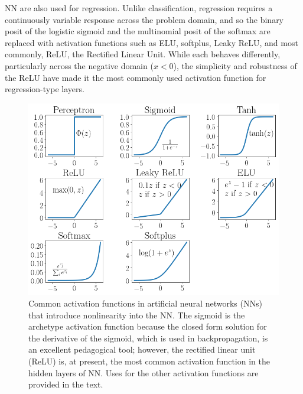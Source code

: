 NN are also used for regression. Unlike classification, regression requires a continuously variable response across the problem domain, and so the binary posit of the logistic sigmoid and the multinomial posit of the softmax are replaced with activation functions such as ELU, softplus, Leaky ReLU, and most commonly, ReLU, the Rectified Linear Unit. While each behaves differently, particularly across the negative domain ($x < 0$), the simplicity and robustness of the ReLU have made it the most commonly used activation function for regression-type layers.
\begin{figure}
	\includegraphics[width=0.85\linewidth]{Images/ActivationFunctions}
	\caption{Common activation functions in artificial neural networks (NNs) that introduce nonlinearity into the NN. The sigmoid is the archetype activation function because the closed form solution for the derivative of the sigmoid, which is used in backpropagation, is an excellent pedagogical tool; however, the rectified linear unit (ReLU) is, at present, the most common activation function in the hidden layers of NN. Uses for the other activation functions are provided in the text.}
	\label{fig:activation functions}
\end{figure}

